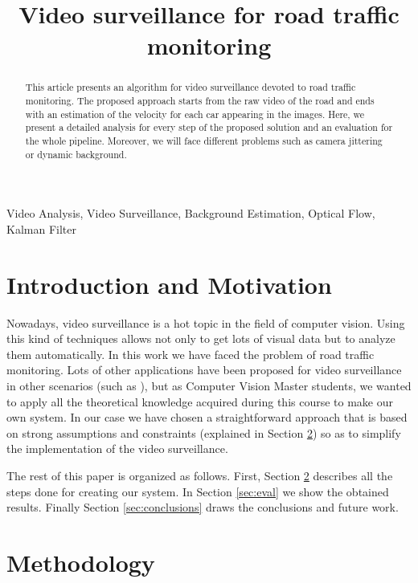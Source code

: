 \documentclass{article}
\title{Video surveillance for road traffic monitoring}
\begin{document}
%
\maketitle
%
\begin{abstract}
This article presents an algorithm for video surveillance devoted to road traffic monitoring. The proposed approach starts from the raw video of the road and ends with an estimation of the velocity for each car appearing in the images. Here, we present a detailed analysis for every step of the proposed solution and an evaluation for the whole pipeline. Moreover, we will face different problems such as camera jittering or dynamic background.
\end{abstract}

\begin{keywords}
Video Analysis, Video Surveillance, Background Estimation, Optical Flow, Kalman Filter
\end{keywords}
%
\section{Introduction and Motivation}
\label{sec:intro}

Nowadays, video surveillance is a hot topic in the field of computer vision. Using this kind of techniques allows not only to get lots of visual data but to analyze them automatically. In this work we have faced the problem of road traffic monitoring. Lots of other applications have been proposed for video surveillance in other scenarios (such as \cite{lipton2002}), but as Computer Vision Master students, we wanted to apply all the theoretical knowledge acquired during this course to make our own system. In our case we have chosen a straightforward approach that is based on strong assumptions and constraints (explained in Section \ref{sec:method}) so as to simplify the implementation of the video surveillance.

The rest of this paper is organized as follows. First, Section \ref{sec:method} describes all the steps done for creating our system. In Section \ref{sec:eval} we show the obtained results. Finally Section \ref{sec:conclusions} draws the conclusions and future work.

\section{Methodology}
\label{sec:method}
\end{document}
